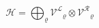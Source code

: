 \begin{equation}
\mathcal{H}= \bigoplus_{\varrho} \mathcal{V^{L}}_{\varrho} \otimes
\mathcal{V^{R}}_{\varrho}
\end{equation}

